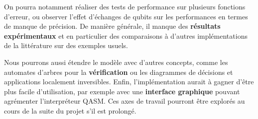 On pourra notamment réaliser des tests de performance sur plusieurs fonctions d'erreur, ou observer l'effet d'échanges de qubits sur les performances en termes de manque de précision. De manière générale, il manque des \textbf{résultats expérimentaux} et en particulier des comparaisons à d'autres implémentations de la littérature sur des exemples usuels.

Nous pourrons aussi étendre le modèle avec d'autres concepts, comme les automates d'arbres pour la \textbf{vérification} ou les diagrammes de décisions et applications localement inversibles. \cite{Chen_2023} \cite{Vinkhuijzen_2023} Enfin, l'implémentation aurait à gagner d'être plus facile d'utilisation, par exemple avec une \textbf{interface graphique} pouvant agrémenter l'interpréteur QASM. Ces axes de travail pourront être explorés au cours de la suite du projet s'il est prolongé.